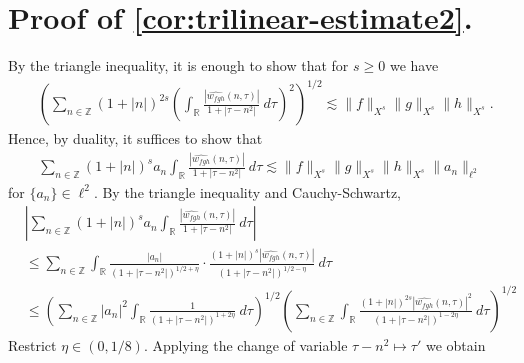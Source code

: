 \documentclass[12pt,reqno]{amsart}
\numberwithin{equation}{section}  %
\numberwithin{figure}{section}
\newcommand{\rr}{\mathbb{R}}
\newcommand{\zz}{\mathbb{Z}}
\newcommand{\wh}{\widehat}
\theoremstyle{plain}
\theoremstyle{definition}
\theoremstyle{remark}
\begin{document}
\section{Proof of \autoref{cor:trilinear-estimate2}.}
By the triangle inequality, it is enough to show that
for $s \ge 0$ we have
%
%
\begin{equation}
  \begin{split}
    & \left( \sum_{n \in \zz} \left (1 + |n| \right )^{2s}  \left ( \int_\rr 
    \frac{|\wh{{w}_{fgh}}(n, \tau) |}{1 + | \tau - n^{2} |}
     \ d\tau \right)^2  \right)^{1/2} 
     \lesssim \|f\|_{X^s} \| g\|_{X^s}
    \| h \|_{X^s}.
  \end{split}
\end{equation}
%
Hence, by duality, it suffices to show that 
%
\begin{equation*}
  \begin{split}
    \sum_{n \in \zz} \left (1 + |n| \right )^{s}
    a_n \int_{\rr} \frac{|\wh{{w}_{fgh}}(n, \tau)|}{1 
    + | \tau - n^{2} |} \ d \tau \lesssim \|f\|_{X^s} \|g\|_{X^s} \|h\|_{X^s}
    \|a_n \|_{\ell^2}
  \end{split}
\end{equation*}
%
for $\{a_n\} \in \ell^2$. By the triangle inequality 
and Cauchy-Schwartz,
%
\begin{equation}
  \label{1m}
  \begin{split}
    & | \sum_{n \in \zz} \left (1 + |n| \right )^{s} a_n
    \int_{\rr}\frac{| \wh{{w}_{fgh}}(n, \tau) |}{1 + | \tau - n^{2} |} \ d \tau |
    \\
    & \le \sum_{n \in \zz} \int_{\rr} \frac{| a_n |}{\left( 1 + 
    | \tau - n^{2} |
    \right)^{1/2 + \eta}} \cdot \frac{\left( 1 + | n| \right)^s  |
    \wh{{w}_{fgh}}(n, \tau) |}{\left( 
    1 + | \tau - n^{2} | \right)^{1/2 - \eta}} \ d \tau
    \\
    & \le \left( \sum_{n \in \zz} | a_{n} |^2\int_{\rr} \frac{1}{\left( 1 + | \tau - n^{2} | \right)^{1 + 2 \eta}} \ d \tau  
    \right)^{1/2} 
    \left ( \sum_{n \in \zz}\int_{\rr} \frac{\left (1 + |n| \right )^{2s} | \wh{{w}_{fgh}}(n, \tau) 
    |^2}{\left( 1 + | \tau - n^{2} | \right)^{1 - 2 \eta}}\ d \tau 
    \right)^{1/2}
  \end{split}
\end{equation}
%
Restrict $\eta \in (0, 1/8)$. Applying the change of variable $\tau - n^{2}
\mapsto \tau'$ we obtain  %
\end{document}
